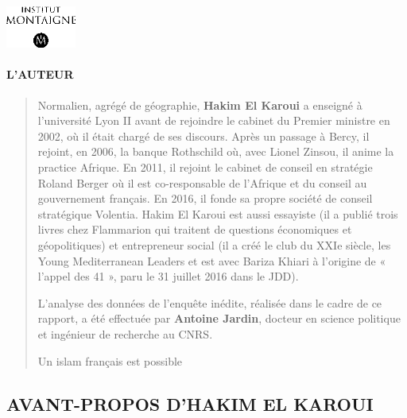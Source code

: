 

\includegraphics[width=0.91222in,height=0.54469in]{ImageIslamFrance/media/image6.png}

\hypertarget{lauteur}{%
\paragraph{L'AUTEUR}\label{lauteur}}

\begin{quote}
Normalien, agrégé de géographie, \textbf{Hakim El Karoui} a enseigné à
l'université Lyon II avant de rejoindre le cabinet du Premier ministre
en 2002, où il était chargé de ses discours. Après un passage à Bercy,
il rejoint, en 2006, la banque Rothschild où, avec Lionel Zinsou, il
anime la practice Afrique. En 2011, il rejoint le cabinet de conseil en
stratégie Roland Berger où il est co-responsable de l'Afrique et du
conseil au gouvernement français. En 2016, il fonde sa propre société de
conseil stratégique Volentia. Hakim El Karoui est aussi essayiste (il a
publié trois livres chez Flammarion qui traitent de questions
économiques et géopolitiques) et entrepreneur social (il a créé le club
du XXIe siècle, les Young Mediterranean Leaders et est avec Bariza
Khiari à l'origine de « l'appel des 41 », paru le 31 juillet 2016 dans
le JDD).

L'analyse des données de l'enquête inédite, réalisée dans le cadre de ce
rapport, a été effectuée par \textbf{Antoine Jardin}, docteur en science
politique et ingénieur de recherche au CNRS.

Un islam français est possible


\end{quote}

\hypertarget{avant-propos-dhakim-el-karoui}{%
\subsection{AVANT-PROPOS D'HAKIM EL
KAROUI}\label{avant-propos-dhakim-el-karoui}}


